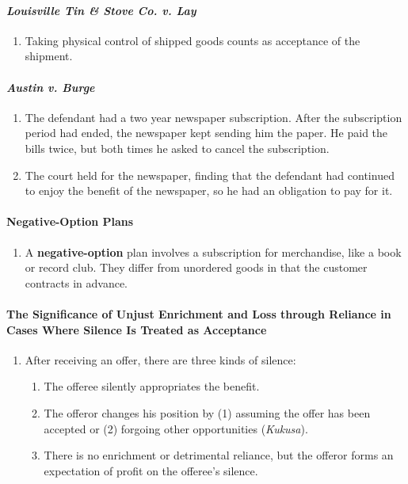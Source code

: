 \paragraph{\emph{Louisville Tin \& Stove Co. v. Lay}}

\begin{enumerate}
    \item Taking physical control of shipped goods counts as acceptance of the 
    shipment.
\end{enumerate}

\paragraph{\emph{Austin v. Burge}}

\begin{enumerate}
    \item The defendant had a two year newspaper subscription. After the 
    subscription period had ended, the newspaper kept sending him the paper. 
    He paid the bills twice, but both times he asked to cancel the 
    subscription.
    \item The court held for the newspaper, finding that the defendant had 
    continued to enjoy the benefit of the newspaper, so he had an obligation 
    to pay for it.
\end{enumerate}

\paragraph{Negative-Option Plans}

\begin{enumerate}
    \item A \textbf{negative-option} plan involves a subscription for 
    merchandise, like a book or record club. They differ from unordered goods 
    in that the customer contracts in advance.
\end{enumerate}

\paragraph{The Significance of Unjust Enrichment and Loss through Reliance in 
Cases Where Silence Is Treated as Acceptance}

\begin{enumerate}
    \item After receiving an offer, there are three kinds of silence:
    \begin{enumerate}
        \item The offeree silently appropriates the benefit.
        \item The offeror changes his position by (1) assuming the offer has 
        been accepted or (2) forgoing other opportunities (\emph{Kukusa}).
        \item There is no enrichment or detrimental reliance, but the offeror 
        forms an expectation of profit on the offeree's silence.
    \end{enumerate}
\end{enumerate}

